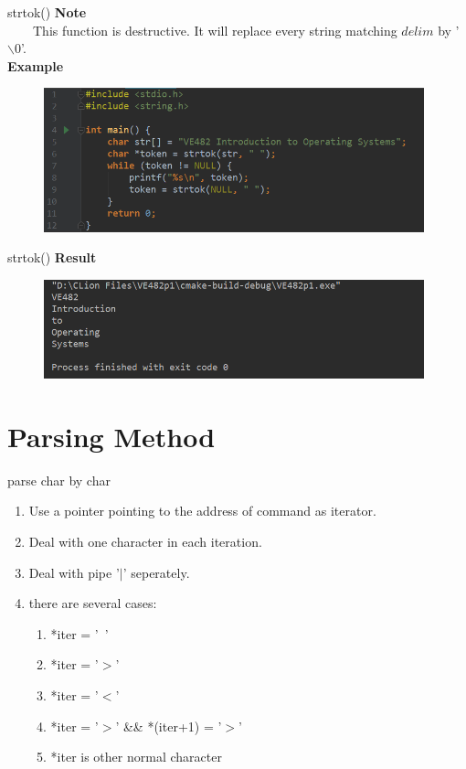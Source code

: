 \documentclass[12pt]{beamer}
\begin{document}
\begin{frame}{strtok()}
    \textbf{Note} \\
    \ \ \ \ This function is destructive. It will replace every string matching $delim$ by '$\backslash0$'.\\
    \textbf{Example}
    \begin{figure}
        \centering
        \includegraphics[width=11cm]{1.png}
        \label{fig:example_strtok}
    \end{figure}
\end{frame}

\begin{frame}{strtok()}
    \textbf{Result}
    \begin{figure}
        \centering
        \includegraphics[width=11cm]{2.png}
        \label{fig:result_strtok}
    \end{figure}
\end{frame}

\section{Parsing Method}
\begin{frame}{parse char by char}
\begin{enumerate}
    \item Use a pointer pointing to the address of command as iterator.
    \item Deal with one character in each iteration.
    \item Deal with pipe '$|$' seperately.
    \item there are several cases:
    \begin{enumerate}
        \item *iter = '\ '
        \item *iter = '$ > $'
        \item *iter = '$ < $'
        \item *iter = '$ > $' \&\& *(iter+1) = '$ > $'
        \item *iter is other normal character
    \end{enumerate}
\end{enumerate}
\end{frame}
\end{document}
